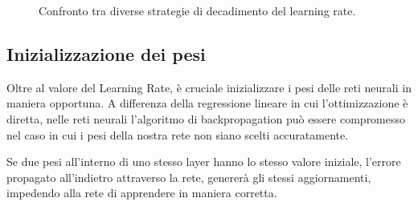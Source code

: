 \begin{figure}[!ht]
    \centering
    \caption{Confronto tra diverse strategie di decadimento del learning rate.}
    \label{fig:lr_decay}
\end{figure}

\subsection{Inizializzazione dei pesi}
Oltre al valore del Learning Rate, è cruciale inizializzare i pesi delle reti neurali in maniera opportuna. A differenza della regressione lineare in cui l'ottimizzazione è diretta, nelle reti neurali l'algoritmo di backpropagation può essere compromesso nel caso in cui i pesi della nostra rete non siano scelti accuratamente. 

\begin{Osservazione}
    Se due pesi all'interno di uno stesso layer hanno lo stesso valore iniziale, l'errore propagato all'indietro attraverso la rete, genererà gli stessi aggiornamenti, impedendo alla rete di apprendere in maniera corretta.
\end{Osservazione}


